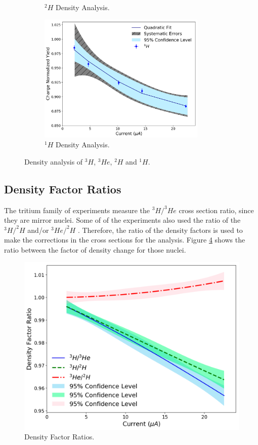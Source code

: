 \documentclass[final,5p,times,twocolumn]{elsarticle}
\begin{document}
\begin{figure}[h]
\begin{center}
\begin{subfigure}{8cm}
    \caption{$^{2}H$ Density Analysis.}
    \label{fig:deuterium_data}
  \end{subfigure}
  \begin{subfigure}{8cm}
    \centering\includegraphics[width=8cm]{images/hydrogen_data.pdf}
    \caption{$^{1}H$ Density Analysis.}
    \label{fig:hydrogen_data}
  \end{subfigure}
  \end{center}
  \label{fig:tritium_targets}
  \caption{Density analysis of $^{3}H$, $^{3}He$, $^{2}H$ and $^{1}H$.}
\end{figure}




\subsection{Density Factor Ratios}

The tritium family of experiments measure the $^{3}H/^{3}He$ cross section ratio, since they are mirror nuclei.  Some of of the experiments also used the ratio of the $^{3}H/^{2}H $ and/or  $^{3}He/^{2}H $ . Therefore, the ratio of the density factors is used to make the corrections in the cross sections for the analysis. Figure \ref{fig:density_ratios} shows the ratio between the factor of density change for those nuclei. 


\begin{figure}[!h]
 \centering
 \includegraphics[width=\linewidth]{images/density_factor_ratios.pdf}
  \caption{Density Factor Ratios. }
  \label{fig:density_ratios}
\end{figure}
\end{document}
